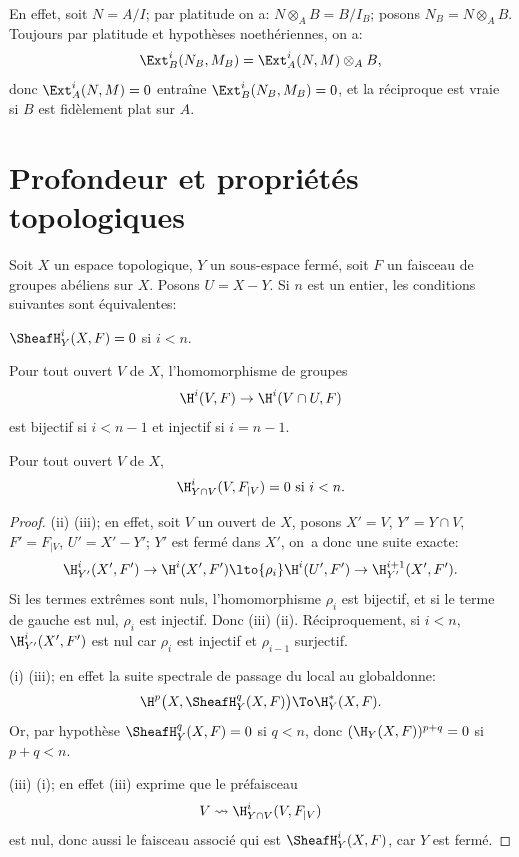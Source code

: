 En effet, soit $N=A/I$; par platitude on a: $N\otimes_A B=B/I_B$; posons $N_B=N\otimes_A B$. Toujours par platitude et hypoth\`eses noeth\'eriennes, on a:
\[
\Ext_B^i (N_B, M_B) = \Ext_A^i(N, M)\otimes_A B,
\]
donc $\Ext_A^i(N, M) = 0 $ entra\^ine $\Ext_B^i(N_B, M_B)=0$, et la r\'eciproque est vraie si $B$ est fid\`element plat sur $A$.

\section{Profondeur et propri\'et\'es topologiques} \label{III.3}

\begin{lemme} \label{III.3.1}
Soit $X$ un espace topologique, $Y$ un sous-espace ferm\'e, soit $F$ un faisceau de groupes ab\'eliens sur $X$. Posons $U=X- Y$. Si $n$ est un entier, les conditions suivantes sont \'equivalentes:
\begin{enumeratei}
\item
$\SheafH_Y^i (X, F)=0$ si $i<n$.\pageoriginale
\item
Pour tout ouvert $V$ de $X$, l'homomorphisme de groupes
\[
\H^i(V, F) \to \H^i(V\cap U, F)
\]
est bijectif si $i<n-1$ et injectif si $i=n-1$.

\item
Pour tout ouvert $V$ de $X$,
\[
\H_{Y\cap V}^i(V, F_{\mid V})=0 \text{ si } i<n.
\]
\end{enumeratei}
\end{lemme}

\skpt

\begin{proof}
(ii) \SSI (iii); en effet, soit $V$ un ouvert de $X$, posons $X'=V$, $Y'=Y\cap V$, $F'=F_{\mid V}$, $U'=X'- Y'$; $Y'$ est ferm\'e dans $X'$, on~a donc une suite exacte:
\[
\H_{Y'}^i(X', F') \to \H^i(X', F') \lto{\rho_i} \H^i(U', F') \to \H_{Y'}^{i+1}(X', F').
\]
Si les termes extr\^emes sont nuls, l'homomorphisme $\rho_i$ est bijectif, et si le terme de gauche est nul, $\rho_i$ est injectif. Donc (iii) \ALORS (ii). R\'eciproquement, si $i<n$, $\H_{Y'}^i(X', F')$ est nul car $\rho_i$ est injectif et $\rho_{i-1}$ surjectif.

(i) \ALORS (iii); en effet la suite spectrale \og de passage du local au global\fg donne:
\[
\H^p\bigl(X, \SheafH_Y^q(X, F)\bigr) \To \H_Y^*(X, F).
\]
Or, par hypoth\`ese $\SheafH_Y^q(X, F) =0$ si $q<n$, donc $(\H_Y (X, F))^{p+q} = 0$ si $p+q<n$.

(iii) \ALORS (i); en effet (iii) exprime que le pr\'efaisceau
\[
V \rightsquigarrow \H_{Y\cap V}^i(V, F_{\mid V})
\]
est nul, donc aussi le faisceau associ\'e qui est $\SheafH_Y^i (X, F)$, car $Y$ est ferm\'e.
\skipqed
\end{proof}

